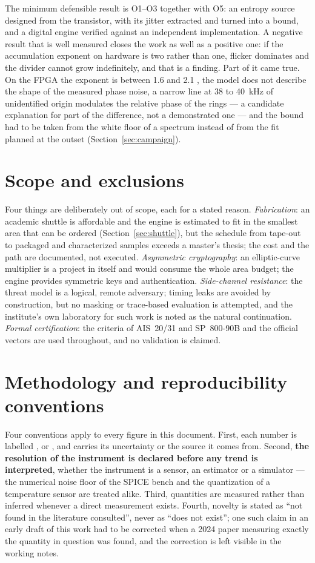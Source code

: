 The minimum defensible result is O1--O3 together with O5: an entropy
source designed from the transistor, with its jitter extracted and turned
into a bound, and a digital engine verified against an independent
implementation. A negative result that is well measured closes the work
as well as a positive one: if the accumulation exponent on hardware is
two rather than one, flicker dominates and the divider cannot grow
indefinitely, and that is a finding. Part of it came true. On the
FPGA the exponent is between 1.6 and 2.1 \meas{}, the model does not
describe the shape of the measured phase noise, a narrow line at 38 to
40~kHz of unidentified origin modulates the relative phase of the rings
--- a candidate explanation for part of the difference, not a
demonstrated one --- and the bound had to be taken from the white floor of a spectrum instead of from
the fit planned at the outset (Section~\ref{sec:campaign}).

\section{Scope and exclusions}
\label{sec:scope}

Four things are deliberately out of scope, each for a stated reason.
\emph{Fabrication}: an academic shuttle is affordable and the engine is
estimated to fit in the smallest area that can be ordered \est{}
(Section~\ref{sec:shuttle}), but the schedule from tape-out to packaged
and characterized samples exceeds a master's thesis; the cost and the path
are documented, not executed. \emph{Asymmetric cryptography}: an
elliptic-curve multiplier is a project in itself and would consume the
whole area budget; the engine provides symmetric keys and authentication.
\emph{Side-channel resistance}: the threat model is a logical, remote
adversary; timing leaks are avoided by construction, but no masking or
trace-based evaluation is attempted, and the institute's own laboratory
for such work is noted as the natural continuation. \emph{Formal
certification}: the criteria of AIS~20/31 and SP~800-90B and the official
vectors are used throughout, and no validation is claimed.

\section{Methodology and reproducibility conventions}
\label{sec:conventions}

Four conventions apply to every figure in this document. First, each
number is labelled \meas{}, \simu{} or \est{}, and carries its
uncertainty or the source it comes from. Second, \textbf{the resolution of
the instrument is declared before any trend is interpreted}, whether the
instrument is a sensor, an estimator or a simulator --- the numerical
noise floor of the SPICE bench and the quantization of a temperature
sensor are treated alike. Third, quantities are measured rather than
inferred whenever a direct measurement exists. Fourth, novelty is stated
as ``not found in the literature consulted'', never as ``does not exist'';
one such claim in an early draft of this work had to be corrected when a
2024 paper measuring exactly the quantity in question was found, and the
correction is left visible in the working notes.

